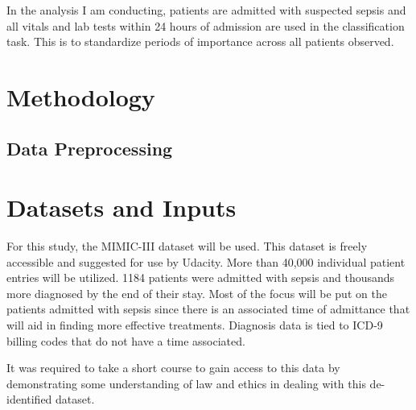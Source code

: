 \documentclass[11pt]{article}
\begin{document}
In the analysis I am conducting, patients are admitted with suspected sepsis and all vitals and lab tests within 24 hours of admission are used in the classification task. This is to standardize periods of importance across all patients observed.

\section{Methodology}
\subsection{Data Preprocessing}





\section{Datasets and Inputs}
For this study, the MIMIC-III dataset will be used. This dataset is freely accessible and suggested for use by Udacity. More than 40,000 individual patient entries will be utilized. 1184 patients were admitted with sepsis and thousands more diagnosed by the end of their stay. Most of the focus will be put on the patients admitted with sepsis since there is an associated time of admittance that will aid in finding more effective treatments. Diagnosis data is tied to ICD-9 billing codes that do not have a time associated.

It was required to take a short course to gain access to this data by demonstrating some understanding of law and ethics in dealing with this de-identified dataset.
\end{document}
